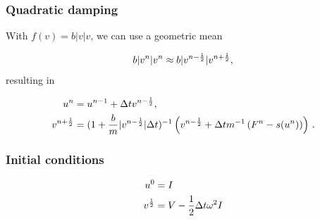 \documentclass{beamer}
\begin{document}
\begin{frame}
\frametitle{Quadratic damping}

With $f(v)=b|v|v$, we can use a geometric mean

\[
b|v^n|v^n\approx b|v^{n-\half}|v^{n+\half},
\]
resulting in

\begin{align*}
u^n & = u^{n-1} + {\Delta t}v^{n-\half},\\ 
v^{n+\half} &= (1 + \frac{b}{m}|v^{n-\half}|\Delta t)^{-1}\left(
v^{n-\half} + {\Delta t}
m^{-1}\left(F^n - s(u^n)\right)\right)\tp
\end{align*}
\end{frame}

\begin{frame}
\frametitle{Initial conditions}

\begin{align*}
u^0 &= I\\ 
v^{\half} &= V - \half\Delta t\omega^2I
\end{align*}
\end{frame}
\end{document}
